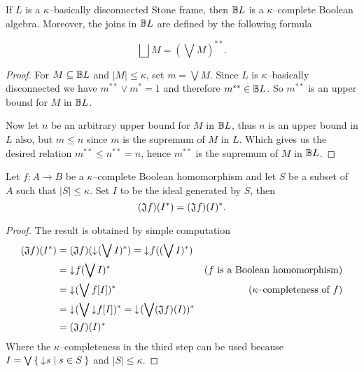 \begin{lemma}\label{p:kappaComplStoneFrm}
    If $L$ is a $\kappa$--basically disconnected Stone frame, then $\mathbb{B} L$ is a $\kappa$--complete Boolean algebra. Moreover, the joins in $\mathbb{B} L$ are defined by the following formula

    $$\bigsqcup M = (\bigvee M)^{**}.$$
\end{lemma}
\begin{proof}
    For $M \subseteq \mathbb{B} L$ and $|M| \leq \kappa$, set $m = \bigvee M$. Since $L$ is $\kappa$--basically disconnected we have $m^{**} \vee m^* = 1$ and therefore $m^{**} \in \mathbb{B} L$. So $m^{**}$ is an upper bound for $M$ in $\mathbb{B} L$.

    Now let $n$ be an arbitrary upper bound for $M$ in $\mathbb{B} L$, thus $n$ is an upper bound in $L$ also, but $m \leq n$ since $m$ is the supremum of $M$ in $L$. Which gives us the desired relation $m^{**} \leq n^{**} = n$, hence $m^{**}$ is the supremum of $M$ in $\mathbb{B} L$.
\end{proof}

\begin{observation}
    Let $f\colon A \to B$ be a $\kappa$--complete Boolean homomorphism and let $S$ be a subset of $A$ such that $|S| \leq \kappa$. Set $I$ to be the ideal generated by $S$, then
    $$(\mathfrak{J} f)(I^*) = (\mathfrak{J} f)(I)^*.$$
\end{observation}
\begin{proof}
    The result is obtained by simple computation
    \begin{align*}
        (\mathfrak{J} f)(I^*) &= (\mathfrak{J} f)(\mathord{\downarrow}\mkern1mu (\bigvee I)^*) = \mathord{\downarrow}\mkern1mu f((\bigvee I)^*) \\
                &= \mathord{\downarrow}\mkern1mu f(\bigvee I)^* & \text{($f$ is a Boolean homomorphism)} \\
                &= \mathord{\downarrow}\mkern1mu (\bigvee f[I])^* & \text{($\kappa$--completeness of $f$)} \\
                &= \mathord{\downarrow}\mkern1mu (\bigvee \mathord{\downarrow}\mkern1mu f[I])^* = \mathord{\downarrow}\mkern1mu (\bigvee (\mathfrak{J} f)(I))^* \\
                &= (\mathfrak{J} f)(I)^*
    \end{align*}
    Where the $\kappa$--completeness in the third step can be used because $I = \bigvee \Set{ \mathord{\downarrow}\mkern1mus | s \in S }$ and $|S| \leq \kappa$.
\end{proof}


